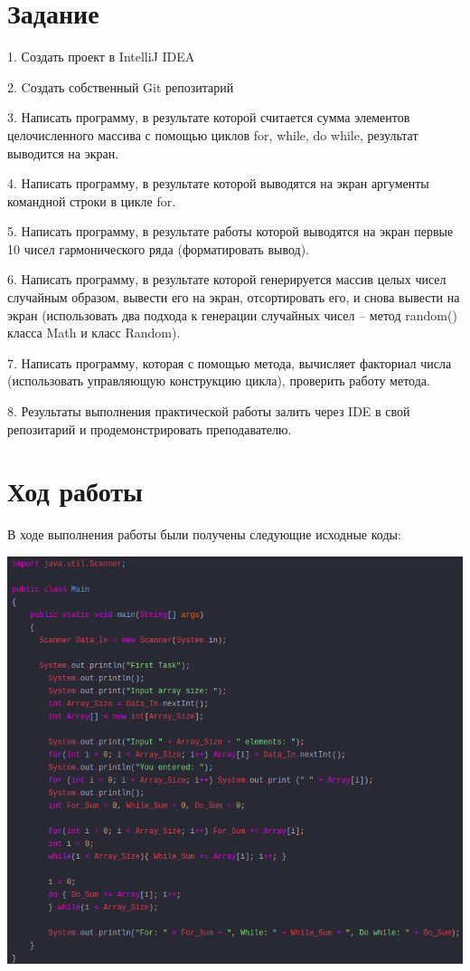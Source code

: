 \documentclass{article}
\begin{document}


\section{Задание}

1. Создать проект в IntelliJ IDEA

2. Cоздать собственный Git репозитарий

3. Написать программу, в результате которой считается сумма элементов целочисленного массива с помощью циклов for, while, do while, результат выводится на экран.

4. Написать программу, в результате которой выводятся на экран аргументы командной строки в цикле for.

5. Написать программу, в результате работы которой выводятся на экран первые 10 чисел гармонического ряда (форматировать вывод).

6. Написать программу, в результате которой генерируется массив целых чисел случайным образом, вывести его на экран, отсортировать его, и снова вывести на экран (использовать два подхода к генерации случайных чисел – метод random() класса Math и класс Random).

7. Написать программу, которая с помощью метода, вычисляет факториал числа (использовать управляющую конструкцию цикла), проверить работу метода.

8. Результаты выполнения практической работы залить через IDE в свой репозитарий и продемонстрировать преподавателю.

\section{Ход работы}

В ходе выполнения работы были получены следующие исходные коды:

\includegraphics[width=0.7\linewidth]{view1.png}
\end{document}
